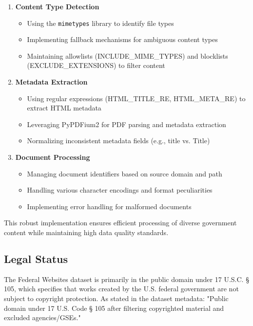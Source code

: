 \begin{enumerate}
    \item \textbf{Content Type Detection}
    \begin{itemize}
        \item Using the \texttt{mimetypes} library to identify file types
        \item Implementing fallback mechanisms for ambiguous content types
        \item Maintaining allowlists (INCLUDE\_MIME\_TYPES) and blocklists (EXCLUDE\_EXTENSIONS) to filter content
    \end{itemize}
    
    \item \textbf{Metadata Extraction}
    \begin{itemize}
        \item Using regular expressions (HTML\_TITLE\_RE, HTML\_META\_RE) to extract HTML metadata
        \item Leveraging PyPDFium2 for PDF parsing and metadata extraction
        \item Normalizing inconsistent metadata fields (e.g., title vs. Title)
    \end{itemize}
    
    \item \textbf{Document Processing}
    \begin{itemize}
        \item Managing document identifiers based on source domain and path
        \item Handling various character encodings and format peculiarities
        \item Implementing error handling for malformed documents
    \end{itemize}
\end{enumerate}

This robust implementation ensures efficient processing of diverse government content while maintaining high data quality standards.

\subsection{Legal Status}

The Federal Websites dataset is primarily in the public domain under 17 U.S.C. § 105, which specifies that works created by the U.S. federal government are not subject to copyright protection. As stated in the dataset metadata: "Public domain under 17 U.S. Code § 105 after filtering copyrighted material and excluded agencies/GSEs."

